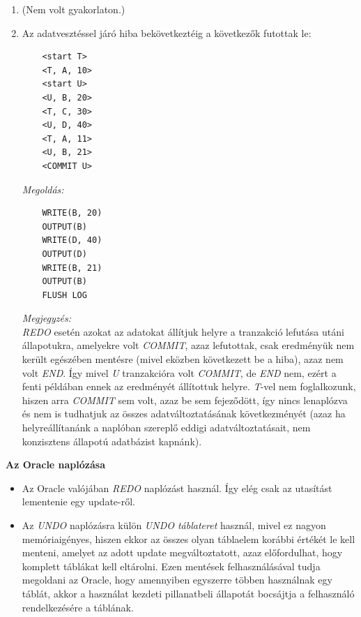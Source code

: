 \documentclass[a4paper,11.5pt, table]{article}
\begin{document}
\begin{itemize}
		\begin{enumerate}[label=\alph*)]
			\item (Nem volt gyakorlaton.)
			\item Az adatvesztéssel járó hiba bekövetkeztéig a következők futottak le:
			\begin{lstlisting}
	<start T> 
	<T, A, 10> 
	<start U> 
	<U, B, 20> 
	<T, C, 30> 
	<U, D, 40>
	<T, A, 11>
	<U, B, 21>  
	<COMMIT U>
			\end{lstlisting}
			\textit{Megoldás:}
			\begin{lstlisting}
	WRITE(B, 20)
	OUTPUT(B)
	WRITE(D, 40)
	OUTPUT(D)
	WRITE(B, 21)
	OUTPUT(B)
	FLUSH LOG
			\end{lstlisting}
			\textit{Megjegyzés:}\\
			\textit{REDO} esetén azokat az adatokat állítjuk helyre a tranzakció lefutása utáni állapotukra, amelyekre volt \textit{COMMIT}, azaz lefutottak, csak eredményük nem került egészében mentésre (mivel eközben következett be a hiba), azaz nem volt \textit{END}. Így mivel \textit{U} tranzakcióra volt \textit{COMMIT}, de \textit{END} nem, ezért a fenti példában ennek az eredményét állítottuk helyre. \textit{T}-vel nem foglalkozunk, hiszen arra \textit{COMMIT} sem volt, azaz be sem fejeződött, így nincs lenaplózva és nem is tudhatjuk az összes adatváltoztatásának következményét (azaz ha helyreállítanánk a naplóban szereplő eddigi adatváltoztatásait, nem konzisztens állapotú adatbázist kapnánk).
		\end{enumerate}
		
	\end{itemize}

	\textbf{Az Oracle naplózása}
	\begin{itemize}
		\item Az Oracle valójában \textit{REDO} naplózást használ. Így elég csak az utasítást lementenie egy update-ről.
		
		\item Az \textit{UNDO} naplózásra külön \textit{UNDO táblateret} használ, mivel ez nagyon memóriaigényes, hiszen ekkor az összes olyan táblaelem korábbi értékét le kell menteni, amelyet az adott update megváltoztatott, azaz előfordulhat, hogy komplett táblákat kell eltárolni. Ezen mentések felhasználásával tudja megoldani az Oracle, hogy amennyiben egyszerre többen használnak egy táblát, akkor a használat kezdeti pillanatbeli állapotát bocsájtja a felhasználó rendelkezésére a táblának.
	\end{itemize}
\end{document}
